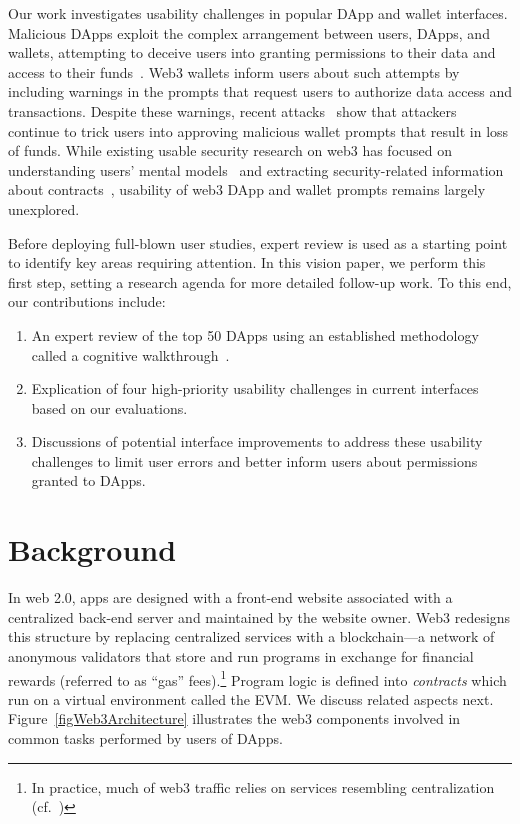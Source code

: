 \documentclass[conference]{IEEEtran}
\begin{document}
Our work investigates usability challenges in popular DApp and wallet interfaces.
Malicious DApps exploit the complex arrangement between users, DApps, and wallets, attempting to deceive users into granting permissions to their data and access to their funds~\cite{si2024understanding,torres2023your}.
Web3 wallets inform users about such attempts by including warnings in the prompts that request users to authorize data access and transactions.
Despite these warnings, recent attacks~\cite{toulas2024lottiefiles,vismaya2024pepe,zmudzinski2024Eigenlayer} show that attackers continue to trick users into approving malicious wallet prompts that result in loss of funds.
While existing usable security research on web3 has focused on understanding users' mental models~\cite{si2024understanding,panicker2024end} and extracting security-related information about contracts~\cite{hu2021automating}, usability of web3 DApp and wallet prompts remains largely unexplored.

Before deploying full-blown user studies, expert review is used as a starting point to identify key areas requiring attention. 
In this vision paper, we perform this first step, setting a research agenda for more detailed follow-up work. To this end, our contributions include:

\begin{enumerate}
\item An expert review of the top 50 DApps using an established methodology called a cognitive walkthrough~\cite{wharton1994cognitive}.
\item Explication of four high-priority usability challenges in current interfaces based on our evaluations. 
\item Discussions of potential interface improvements to address these usability challenges to limit user errors and better inform users about permissions granted to DApps.
\end{enumerate}

\section{Background}




In web 2.0, apps are designed with a front-end website associated with a centralized back-end server and maintained by the website owner.
Web3 redesigns this structure by replacing centralized services with a blockchain---a network of anonymous validators that store and run programs in exchange for financial rewards (referred to as ``gas'' fees).\footnote{In practice, much of web3 traffic relies on services resembling centralization (cf.~\cite{williams2020infura})}
Program logic is defined into \textit{contracts} which run on a virtual environment called the \ac*{EVM}.  We discuss related aspects next.
Figure~\ref{figWeb3Architecture} illustrates the web3 components involved in common tasks performed by users of DApps.
\end{document}
